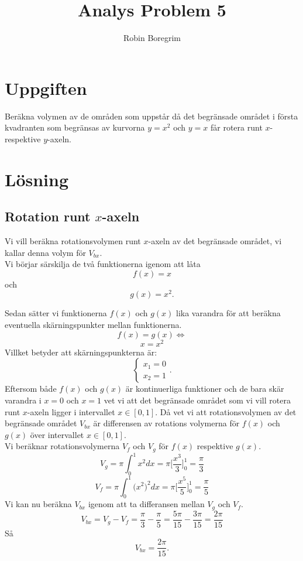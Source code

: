 \documentclass[11pt]{article}
\begin{document}
\title{Analys Problem 5}
\author{Robin Boregrim}
\maketitle
\renewcommand{\contentsname}{Innehållsförteckning}
\tableofcontents
\newpage
\section{Uppgiften}
Beräkna volymen av de områden som uppstår då det begränsade området i första kvadranten som begränsas av kurvorna $y = x^2$ och $y = x$ får rotera runt $x$- respektive  $y$-axeln.
\section{Lösning}

\subsection{Rotation runt $x$-axeln}
Vi vill beräkna rotationsvolymen runt $x$-axeln av det begränsade området, vi kallar denna volym för $V_{bx}$.\\

Vi börjar särskilja de två funktionerna igenom att låta
$$f(x) = x$$och$$g(x) = x^2.$$


Sedan sätter vi funktionerna $f(x)$ och $g(x)$ lika varandra för att beräkna eventuella skärningspunkter mellan funktionerna.
$$f(x) = g(x) \Leftrightarrow$$
$$x = x^2$$
Villket betyder att skärningspunkterna är:
$$
\left\{\begin{array}{c}
x_1 = 0 \\ x_2 = 1
\end{array}\right. .$$
Eftersom både $f(x)$ och $g(x)$ är kontinuerliga funktioner och de bara skär varandra i $x=0$ och $x=1$ vet vi att det begränsade området som vi vill rotera runt $x$-axeln ligger  i intervallet $x\in[0,1]$. Då vet vi att rotationsvolymen av det begränsade området $V_{bx}$  är differensen av rotations volymerna för $f(x)$ och $g(x)$ över intervallet $x\in[0,1]$.\\
Vi beräknar rotationsvolymerna $V_f$ och $V_g$ för $f(x)$ respektive $g(x)$.
$$V_g = \pi \int_0^1 x^2 dx = \pi \Big[\frac{x^3}{3}\Big]_0^1 = \frac{\pi}{3}$$
$$V_f = \pi \int_0^1 \Big(x^2\Big)^2 dx = \pi\Big[\frac{x^5}{5}\Big]_0^1 = \frac{\pi}{5}$$
Vi kan nu beräkna $V_{bx}$ igenom att ta differansen mellan $V_g$ och $V_f$.
$$V_{bx} = V_g - V_f = \frac{\pi}{3} - \frac{\pi}{5}= \frac{5\pi}{15} - \frac{3\pi}{15} = \frac{2\pi}{15}$$
Så $$V_{bx} = \frac{2\pi}{15}.$$ 
\end{document}
